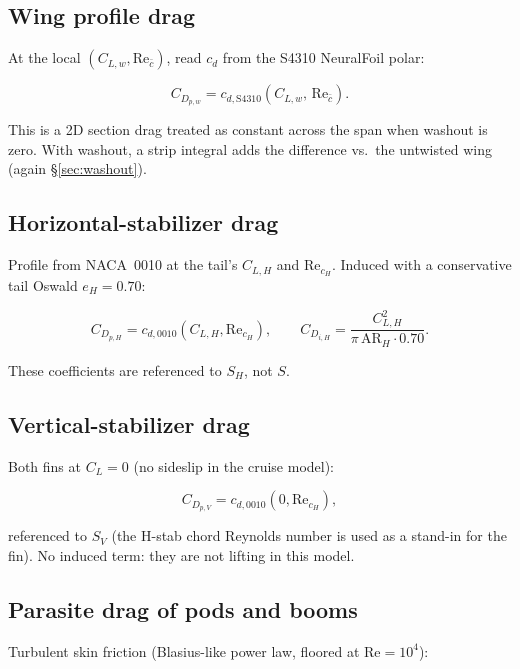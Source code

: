 \documentclass[11pt,letterpaper]{article}
\begin{document}
\subsection{Wing profile drag}

At the local $(C_{L,w}, \mathrm{Re}_{\bar{c}})$, read $c_d$ from the S4310 NeuralFoil polar:

\begin{equation}
  C_{D_{p,w}} = c_{d,\mathrm{S4310}}\!\left(C_{L,w},\, \mathrm{Re}_{\bar{c}}\right).
\end{equation}

This is a 2D section drag treated as constant across the span when washout is zero. With washout, a strip integral adds the difference vs.\ the untwisted wing (again \S\ref{sec:washout}).

\subsection{Horizontal-stabilizer drag}

Profile from NACA~0010 at the tail's $C_{L,H}$ and $\mathrm{Re}_{c_H}$. Induced with a conservative tail Oswald $e_H = 0.70$:

\begin{equation}
  C_{D_{p,H}} = c_{d,0010}(C_{L,H}, \mathrm{Re}_{c_H}), \qquad
  C_{D_{i,H}} = \frac{C_{L,H}^2}{\pi\,\mathrm{AR}_H \cdot 0.70}.
\end{equation}

These coefficients are referenced to $S_H$, not $S$.

\subsection{Vertical-stabilizer drag}

Both fins at $C_L = 0$ (no sideslip in the cruise model):

\begin{equation}
  C_{D_{p,V}} = c_{d,0010}(0, \mathrm{Re}_{c_H}),
\end{equation}

referenced to $S_V$ (the H-stab chord Reynolds number is used as a stand-in for the fin). No induced term: they are not lifting in this model.

\subsection{Parasite drag of pods and booms}

Turbulent skin friction (Blasius-like power law, floored at $\mathrm{Re}=10^4$):
\end{document}

